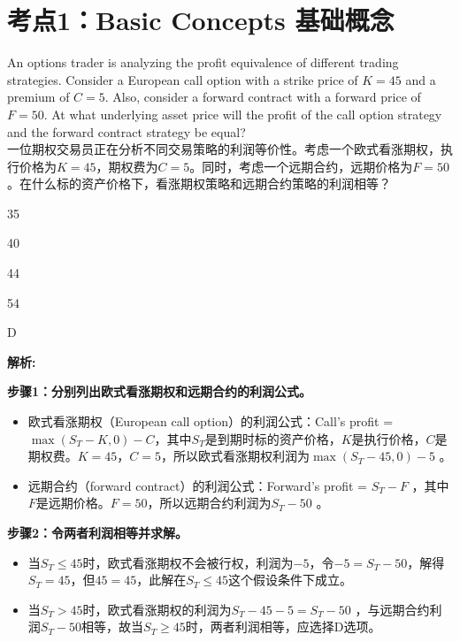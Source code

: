 \documentclass{article}
\newcounter{question} %
\newenvironment{explanation}
{\textbf{解析:}\par}
{\par}
\begin{document}
 \tableofcontents %
\newpage


\section{考点1：Basic Concepts 基础概念}
\setcounter{question}{0}
\begin{question}
    An options trader is analyzing the profit equivalence of different trading strategies. Consider a European call option with a strike price of $K = 45$ and a premium of $C = 5$. Also, consider a forward contract with a forward price of $F = 50$. At what underlying asset price will the profit of the call option strategy and the forward contract strategy be equal?\\
    一位期权交易员正在分析不同交易策略的利润等价性。考虑一个欧式看涨期权，执行价格为$K = 45$，期权费为$C = 5$。同时，考虑一个远期合约，远期价格为$F = 50$。在什么标的资产价格下，看涨期权策略和远期合约策略的利润相等？
    \end{question}
    
    \begin{choices}
        \item 35
        \item 40
        \item 44
        \item 54
    \end{choices}
    
    \begin{correctanswer}
    D
    \end{correctanswer}
    
    \begin{explanation}
    \textbf{步骤1：分别列出欧式看涨期权和远期合约的利润公式。}
    \begin{itemize}
    \item 欧式看涨期权（European call option）的利润公式：Call's profit = $\max(S_T - K, 0)-C$，其中$S_T$是到期时标的资产价格，$K$是执行价格，$C$是期权费。$K = 45$，$C = 5$，所以欧式看涨期权利润为$\max(S_T - 45, 0)-5$ 。
    \item 远期合约（forward contract）的利润公式：Forward's profit = $S_T - F$ ，其中$F$是远期价格。$F = 50$，所以远期合约利润为$S_T - 50$ 。
    \end{itemize}
    \textbf{步骤2：令两者利润相等并求解。}
    \begin{itemize}
    \item 当$S_T\leq45$时，欧式看涨期权不会被行权，利润为$- 5$，令$-5=S_T - 50$，解得$S_T = 45$，但$45=45$，此解在$S_T\leq45$这个假设条件下成立。
    \item 当$S_T>45$时，欧式看涨期权的利润为$S_T - 45 - 5=S_T - 50$ ，与远期合约利润$S_T - 50$相等，故当$S_T\geq45$时，两者利润相等，应选择D选项。 
    \end{itemize}
    \end{explanation}
    
\end{document}
